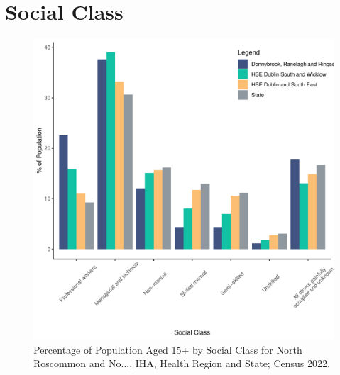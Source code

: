 \documentclass{article}
\begin{document}
\section{Social Class}\label{sect:SC}
\begin{figure}[H]
	\centering
	\includegraphics[width = 140mm]{../figures/SocialClassED.pdf}
	\caption{Percentage of Population Aged 15+ by Social Class for North Roscommon and No..., IHA, Health Region and State; Census 2022.}
	\label{fig:vbnv}
	\end{figure}
\end{document}
